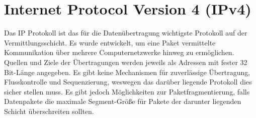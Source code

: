 \section{Internet Protocol Version 4 (IPv4)}


Das IP Protokoll ist das für die Datenübertragung wichtigste Protokoll auf der Vermittlungsschicht. Es wurde entwickelt, um eine Paket vermittelte Kommunikation über mehrere Computernetzwerke hinweg zu ermöglichen. Quellen und Ziele der Übertragungen werden jeweils als Adressen mit fester 32 Bit-Länge angegeben. Es gibt keine Mechanismen für zuverlässige Übertragung, Flusskontrolle und Sequenzierung, weswegen das darüber liegende Protokoll dies sicher stellen muss. Es gibt jedoch Möglichkeiten zur Paketfragmentierung, falls Datenpakete die maximale Segment-Größe für Pakete der darunter liegenden Schicht überschreiten sollten.\cite{IPrfc}

